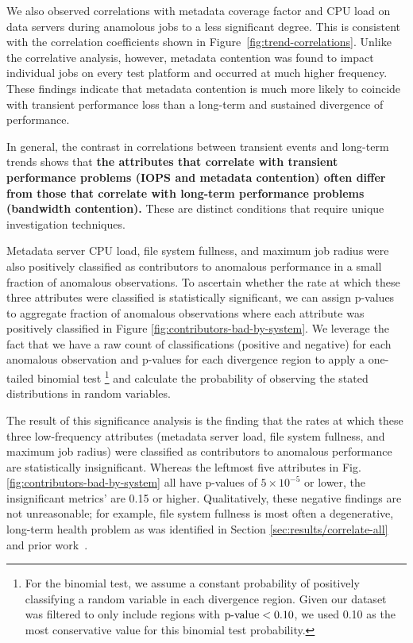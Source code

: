 We also observed correlations with metadata coverage factor and CPU load on
data servers during anamolous jobs to a less significant degree.  This is
consistent with the correlation coefficients shown in
Figure~\ref{fig:trend-correlations}.
Unlike the correlative analysis, however, metadata contention was found to impact individual jobs on every test platform and occurred at much higher frequency.
These findings indicate that metadata contention is much more likely to coincide with transient performance loss than a long-term and sustained divergence of performance.

In general, the contrast in correlations between transient events and
long-term trends shows that \textbf{the attributes that correlate with transient
performance problems (IOPS and
  metadata contention) often differ from those that correlate with
    long-term performance problems (bandwidth contention).} These are distinct conditions that
require unique investigation techniques.

Metadata server CPU load, file system fullness, and maximum job radius were also positively classified as contributors to anomalous performance in a small fraction of anomalous observations.
To ascertain whether the rate at which these three attributes were classified is statistically significant, we can assign p-values to aggregate fraction of anomalous observations where each attribute was positively classified in Figure \ref{fig:contributors-bad-by-system}.
We leverage the fact that we have a raw count of classifications (positive and negative) for each anomalous observation and p-values for each divergence region to apply a one-tailed binomial test
   \footnote{For the binomial test, we assume a constant probability of positively classifying a random variable in each divergence region.
   Given our dataset was filtered to only include regions with $\textup{p-value} < 0.10$, we used 0.10 as the most conservative value for this binomial test probability.}
and calculate the probability of observing the stated distributions in random variables.

The result of this significance analysis is the finding that the rates at which these three low-frequency attributes (metadata server load, file system fullness, and maximum job radius) were classified as contributors to anomalous performance are statistically insignificant.
Whereas the leftmost five attributes in Fig. \ref{fig:contributors-bad-by-system} all have p-values of ${5 \times 10^{-5}}$ or lower, the insignificant metrics' are 0.15 or higher.
Qualitatively, these negative findings are not unreasonable; for example, file system fullness is most often a degenerative, long-term health problem as was identified in Section \ref{sec:results/correlate-all} and prior work~\cite{oral2014best,Lockwood2017}.

